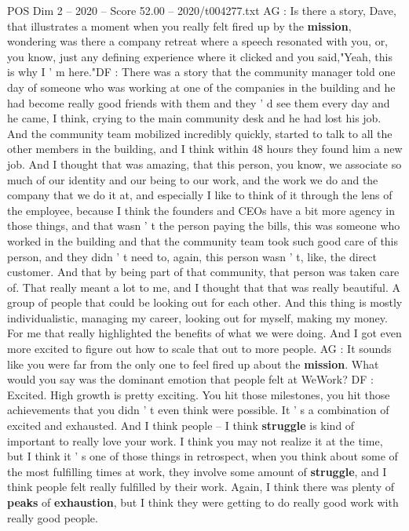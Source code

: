 \begin{textsample}{POS Dim 2 – 2020 – Score 52.00 – 2020/t004277.txt}
AG : Is there a story, Dave, that illustrates a moment when you really felt fired up by the \textbf{mission}, wondering was there a company retreat where a speech resonated with you, or, you know, just any defining experience where it clicked and you said,"Yeah, this is why I ' m here."DF : There was a story that the community manager told one day of someone who was working at one of the companies in the building and he had become really good friends with them and they ' d see them every day and he came, I think, crying to the main community desk and he had lost his job.
And the community team mobilized incredibly quickly, started to talk to all the other members in the building, and I think within 48 hours they found him a new job.
And I thought that was amazing, that this person, you know, we associate so much of our identity and our being to our work, and the work we do and the company that we do it at, and especially I like to think of it through the lens of the employee, because I think the founders and CEOs have a bit more agency in those things, and that wasn ' t the person paying the bills, this was someone who worked in the building and that the community team took such good care of this person, and they didn ' t need to, again, this person wasn ' t, like, the direct customer.
And that by being part of that community, that person was taken care of.
That really meant a lot to me, and I thought that that was really beautiful.
A group of people that could be looking out for each other.
And this thing is mostly individualistic, managing my career, looking out for myself, making my money.
For me that really highlighted the benefits of what we were doing.
And I got even more excited to figure out how to scale that out to more people.
AG : It sounds like you were far from the only one to feel fired up about the \textbf{mission}.
What would you say was the dominant emotion that people felt at WeWork?
DF : Excited.
High growth is pretty exciting.
You hit those milestones, you hit those achievements that you didn ' t even think were possible.
It ' s a combination of excited and exhausted.
And I think people -- I think \textbf{struggle} is kind of important to really love your work.
I think you may not realize it at the time, but I think it ' s one of those things in retrospect, when you think about some of the most fulfilling times at work, they involve some amount of \textbf{struggle}, and I think people felt really fulfilled by their work.
Again, I think there was plenty of \textbf{peaks} of \textbf{exhaustion}, but I think they were getting to do really good work with really good people.

\end{textsample}

